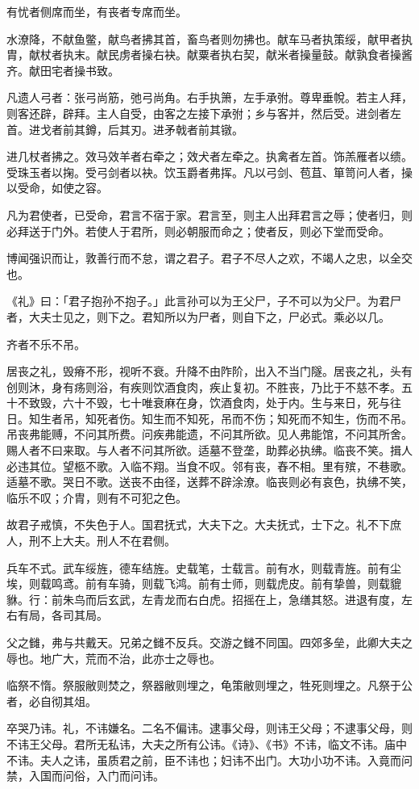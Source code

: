 \documentclass[]{article}
\begin{document}
有忧者侧席而坐，有丧者专席而坐。

水潦降，不献鱼鳖，献鸟者拂其首，畜鸟者则勿拂也。献车马者执策绥，献甲者执胄，献杖者执末。献民虏者操右袂。献粟者执右契，献米者操量鼓。献孰食者操酱齐。献田宅者操书致。

凡遗人弓者：张弓尚筋，弛弓尚角。右手执箫，左手承弣。尊卑垂帨。若主人拜，则客还辟，辟拜。主人自受，由客之左接下承弣；乡与客并，然后受。进剑者左首。进戈者前其鐏，后其刃。进矛戟者前其镦。

进几杖者拂之。效马效羊者右牵之；效犬者左牵之。执禽者左首。饰羔雁者以缋。受珠玉者以掬。受弓剑者以袂。饮玉爵者弗挥。凡以弓剑、苞苴、箪笥问人者，操以受命，如使之容。

凡为君使者，已受命，君言不宿于家。君言至，则主人出拜君言之辱；使者归，则必拜送于门外。若使人于君所，则必朝服而命之；使者反，则必下堂而受命。

博闻强识而让，敦善行而不怠，谓之君子。君子不尽人之欢，不竭人之忠，以全交也。

《礼》曰：「君子抱孙不抱子。」此言孙可以为王父尸，子不可以为父尸。为君尸者，大夫士见之，则下之。君知所以为尸者，则自下之，尸必式。乘必以几。

齐者不乐不吊。

居丧之礼，毁瘠不形，视听不衰。升降不由阼阶，出入不当门隧。居丧之礼，头有创则沐，身有疡则浴，有疾则饮酒食肉，疾止复初。不胜丧，乃比于不慈不孝。五十不致毁，六十不毁，七十唯衰麻在身，饮酒食肉，处于内。生与来日，死与往日。知生者吊，知死者伤。知生而不知死，吊而不伤；知死而不知生，伤而不吊。吊丧弗能赙，不问其所费。问疾弗能遗，不问其所欲。见人弗能馆，不问其所舍。赐人者不曰来取。与人者不问其所欲。适墓不登垄，助葬必执绋。临丧不笑。揖人必违其位。望柩不歌。入临不翔。当食不叹。邻有丧，舂不相。里有殡，不巷歌。适墓不歌。哭日不歌。送丧不由径，送葬不辟涂潦。临丧则必有哀色，执绋不笑，临乐不叹；介胄，则有不可犯之色。

故君子戒慎，不失色于人。国君抚式，大夫下之。大夫抚式，士下之。礼不下庶人，刑不上大夫。刑人不在君侧。

兵车不式。武车绥旌，德车结旌。史载笔，士载言。前有水，则载青旌。前有尘埃，则载鸣鸢。前有车骑，则载飞鸿。前有士师，则载虎皮。前有挚兽，则载貔貅。行：前朱鸟而后玄武，左青龙而右白虎。招摇在上，急缮其怒。进退有度，左右有局，各司其局。

父之雠，弗与共戴天。兄弟之雠不反兵。交游之雠不同国。四郊多垒，此卿大夫之辱也。地广大，荒而不治，此亦士之辱也。

临祭不惰。祭服敝则焚之，祭器敝则埋之，龟策敝则埋之，牲死则埋之。凡祭于公者，必自彻其俎。

卒哭乃讳。礼，不讳嫌名。二名不偏讳。逮事父母，则讳王父母；不逮事父母，则不讳王父母。君所无私讳，大夫之所有公讳。《诗》、《书》不讳，临文不讳。庙中不讳。夫人之讳，虽质君之前，臣不讳也；妇讳不出门。大功小功不讳。入竟而问禁，入国而问俗，入门而问讳。
\end{document}
